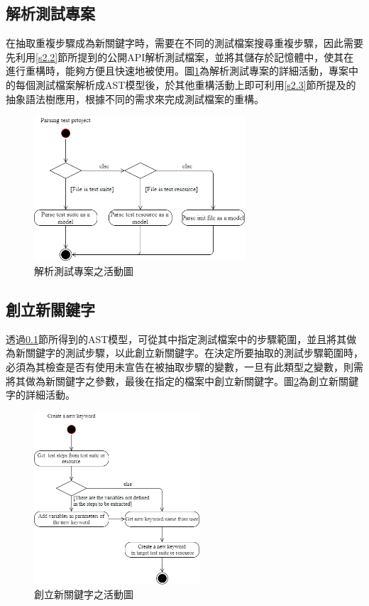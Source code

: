 \subsection{解析測試專案}\label{s3.2.1}
\indent
在抽取重複步驟成為新關鍵字時，需要在不同的測試檔案搜尋重複步驟，因此需要先利用\ref{s2.2}節所提到的公開API解析測試檔案，並將其儲存於記憶體中，使其在進行重構時，能夠方便且快速地被使用。圖\ref{f3.2}為解析測試專案的詳細活動，專案中的每個測試檔案解析成AST模型後，於其他重構活動上即可利用\ref{s2.3}節所提及的抽象語法樹應用，根據不同的需求來完成測試檔案的重構。

\begin{figure}[H]
    \centering
    \includegraphics[width=0.7\textwidth]{picture/Parse_test_project.png}
    \caption{解析測試專案之活動圖}
    \label{f3.2}
\end{figure}

\subsection{創立新關鍵字}\label{s3.2.2}
\indent
透過\ref{s3.2.1}節所得到的AST模型，可從其中指定測試檔案中的步驟範圍，並且將其做為新關鍵字的測試步驟，以此創立新關鍵字。在決定所要抽取的測試步驟範圍時，必須為其檢查是否有使用未宣告在被抽取步驟的變數，一旦有此類型之變數，則需將其做為新關鍵字之參數，最後在指定的檔案中創立新關鍵字。圖\ref{f3.3}為創立新關鍵字的詳細活動。

\begin{figure}[H]
    \centering
    \includegraphics[width=0.55\textwidth]{picture/Create_a_new_keyword.png}
    \caption{創立新關鍵字之活動圖}
    \label{f3.3}
\end{figure}

